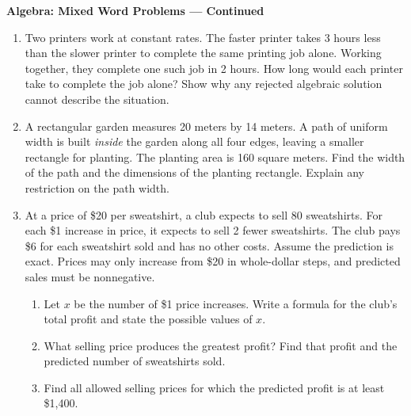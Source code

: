 \documentclass[12pt]{article}
\begin{document}
\newpage
\begin{center}
  {\large\textbf{Algebra: Mixed Word Problems --- Continued}}
\end{center}

\begin{enumerate}[leftmargin=*,itemsep=0pt,resume]
  \item Two printers work at constant rates. The faster printer takes
  3 hours less than the slower printer to complete the same printing job
  alone. Working together, they complete one such job in 2 hours.
  How long would each printer take to complete the job alone? Show why
  any rejected algebraic solution cannot describe the situation.

  \item A rectangular garden measures 20 meters by 14 meters. A path of
  uniform width is built \emph{inside} the garden along all four edges,
  leaving a smaller rectangle for planting. The planting area is
  160 square meters. Find the width of the path and the dimensions of
  the planting rectangle. Explain any restriction on the path width.

  \item At a price of \$20 per sweatshirt, a club expects to sell
  80 sweatshirts. For each \$1 increase in price, it expects to sell
  2 fewer sweatshirts. The club pays \$6 for each sweatshirt sold and
  has no other costs. Assume the prediction is exact. Prices may only
  increase from \$20 in whole-dollar steps, and predicted sales must
  be nonnegative.
  \begin{enumerate}[label=(\alph*),leftmargin=1.6em,itemsep=0.2em]
    \item Let $x$ be the number of \$1 price increases. Write a formula
    for the club's total profit and state the possible values of $x$.
    \item What selling price produces the greatest profit? Find that
    profit and the predicted number of sweatshirts sold.
    \item Find all allowed selling prices for which the predicted
    profit is at least \$1,400.
  \end{enumerate}
\end{enumerate}
\end{document}
